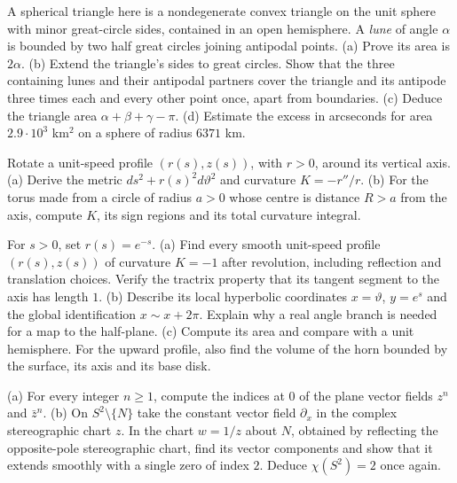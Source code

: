 \begin{exercise}[$\star$]\label{ex:girard}
A spherical triangle here is a nondegenerate convex triangle on the unit sphere with minor great-circle sides, contained in an open hemisphere. A \emph{lune} of angle $\alpha$ is bounded by two half great circles joining antipodal points.
(a) Prove its area is $2\alpha$.
(b) Extend the triangle's sides to great circles. Show that the three containing lunes and their antipodal partners cover the triangle and its antipode three times each and every other point once, apart from boundaries.
(c) Deduce the triangle area $\alpha+\beta+\gamma-\pi$.
(d) Estimate the excess in arcseconds for area $2.9\cdot10^3$ km$^2$ on a sphere of radius $6371$ km.
\end{exercise}

\begin{exercise}[$\star$]\label{ex:revolution}
Rotate a unit-speed profile $(r(s),z(s))$, with $r>0$, around its vertical axis.
(a) Derive the metric $ds^2+r(s)^2d\vartheta^2$ and curvature $K=-r''/r$.
(b) For the torus made from a circle of radius $a>0$ whose centre is distance $R>a$ from the axis, compute $K$, its sign regions and its total curvature integral.
\end{exercise}

\begin{exercise}[$\star\star$]\label{ex:pseudosphere}
For $s>0$, set $r(s)=e^{-s}$.
(a) Find every smooth unit-speed profile $(r(s),z(s))$ of curvature $K=-1$ after revolution, including reflection and translation choices. Verify the tractrix property that its tangent segment to the axis has length $1$.
(b) Describe its local hyperbolic coordinates $x=\vartheta$, $y=e^s$ and the global identification $x\sim x+2\pi$. Explain why a real angle branch is needed for a map to the half-plane.
(c) Compute its area and compare with a unit hemisphere. For the upward profile, also find the volume of the horn bounded by the surface, its axis and its base disk.
\end{exercise}

\begin{exercise}[$\star$]\label{ex:chisphere}
(a) For every integer $n\ge1$, compute the indices at $0$ of the plane vector fields $z^n$ and $\bar z^n$.
(b) On $S^2\setminus\{N\}$ take the constant vector field $\partial_x$ in the complex stereographic chart $z$. In the chart $w=1/z$ about $N$, obtained by reflecting the opposite-pole stereographic chart, find its vector components and show that it extends smoothly with a single zero of index $2$. Deduce $\chi(S^2)=2$ once again.
\end{exercise}

